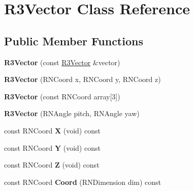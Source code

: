 \hypertarget{class_r3_vector}{}\section{R3\+Vector Class Reference}
\label{class_r3_vector}
\subsection*{Public Member Functions}
\begin{DoxyCompactItemize}
\item 
{\bfseries R3\+Vector} (const \hyperlink{class_r3_vector}{R3\+Vector} \&vector)\hypertarget{class_r3_vector_a3c68c8b22ad15d36318627c3d7031578}{}\label{class_r3_vector_a3c68c8b22ad15d36318627c3d7031578}

\item 
{\bfseries R3\+Vector} (R\+N\+Coord x, R\+N\+Coord y, R\+N\+Coord z)\hypertarget{class_r3_vector_a802b0ce832dd646f01ced7b267847d23}{}\label{class_r3_vector_a802b0ce832dd646f01ced7b267847d23}

\item 
{\bfseries R3\+Vector} (const R\+N\+Coord array\mbox{[}3\mbox{]})\hypertarget{class_r3_vector_a3df5ee67d3c39cd6641a3a460186f22c}{}\label{class_r3_vector_a3df5ee67d3c39cd6641a3a460186f22c}

\item 
{\bfseries R3\+Vector} (R\+N\+Angle pitch, R\+N\+Angle yaw)\hypertarget{class_r3_vector_a6176c064fc30745aa03be14cdbbd28fc}{}\label{class_r3_vector_a6176c064fc30745aa03be14cdbbd28fc}

\item 
const R\+N\+Coord {\bfseries X} (void) const \hypertarget{class_r3_vector_a9b8d5bfc58d7f668092201694fd84f98}{}\label{class_r3_vector_a9b8d5bfc58d7f668092201694fd84f98}

\item 
const R\+N\+Coord {\bfseries Y} (void) const \hypertarget{class_r3_vector_af7890c6f1f26cd1ab45954fc8f15f926}{}\label{class_r3_vector_af7890c6f1f26cd1ab45954fc8f15f926}

\item 
const R\+N\+Coord {\bfseries Z} (void) const \hypertarget{class_r3_vector_ab07667fa94eb1f96dda34071efcb4b52}{}\label{class_r3_vector_ab07667fa94eb1f96dda34071efcb4b52}

\item 
const R\+N\+Coord {\bfseries Coord} (R\+N\+Dimension dim) const \hypertarget{class_r3_vector_a7790d719b4dc20db26ec07022f4d8c9f}{}\label{class_r3_vector_a7790d719b4dc20db26ec07022f4d8c9f}


\end{DoxyCompactItemize}
